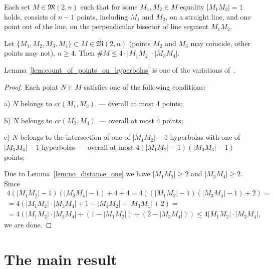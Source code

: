 \documentclass[11pt,twoside,draft
]{article}
\theoremstyle{plain}
\begin{document}
\begin{lemma}
	\cite[Theorem 3.10]{my-pps-linear-bound-2019}
	\label{lem:no_distance_one}
	Each set $M\in\mathfrak{M}(2,n)$
	such that for some $M_1,M_2 \in M$ equality $|M_1 M_2|=1$ holds,
	consists of $n-1$ points, including $M_1$ and $M_2$, on a straight line,
	and one point out of the line, on the perpendicular bisector of line segment $M_1 M_2$.
\end{lemma}


\begin{lemma}
	\label{lem:count_of_points_on_hyperbolas}
	Let $\{M_1, M_2, M_3, M_4\} \subset M\in\overline{\mathfrak{M}}(2,n)$
	(points $M_2$ and $M_3$ may coincide, other points may not), $n\geq 4$.
	Then $\# M \leq 4 \cdot |M_1 M_2| \cdot |M_3 M_4|$.
\end{lemma}

\begin{remark}
	Lemma~\ref{lem:count_of_points_on_hyperbolas} is one of the variations of~\cite{erdos1945integral}.
\end{remark}

\begin{proof}
	Each point $N\in M$ satisfies one of the following conditions:

	a) $N$ belongs to $cr(M_1,M_2)$~--- overall at most 4 points;

	b) $N$ belongs to $cr(M_3,M_4)$~--- overall at most 4 points;

	c) $N$ belongs to the intersection of one of $|M_1 M_2| - 1$ hyperbolas
	with one of $|M_3 M_4| - 1$ hyperbolas~--- overall at most $4 (|M_1 M_2| - 1)(|M_3 M_4| - 1)$ points;

	Due to Lemma~\ref{lem:no_distance_one} we have $|M_1 M_2| \geq 2$ and $|M_3 M_4| \geq 2$.
	Since
	\begin{multline}
		4 (|M_1 M_2| - 1)(|M_3 M_4| - 1) + 4 + 4
		=
		4 ( (|M_1 M_2| - 1)(|M_3 M_4| - 1) + 2)
		=
		\\=
		4 ( |M_1 M_2| \cdot |M_3 M_4| + 1 - |M_1 M_2| - |M_3 M_4| + 2)
		=
		\\=
		4 ( |M_1 M_2| \cdot |M_3 M_4| + (1 - |M_1 M_2|) + (2 - |M_3 M_4|))
		\leq
		4 |M_1 M_2| \cdot |M_3 M_4|
		,
	\end{multline}
	we are done.
\end{proof}


\section{The main result}
\end{document}
